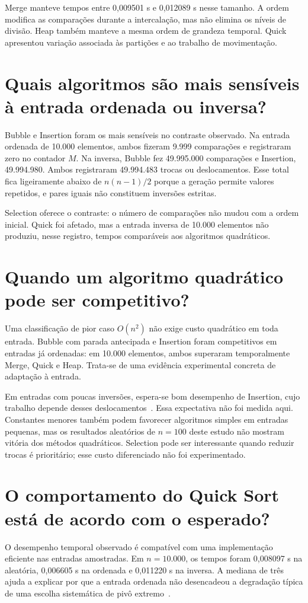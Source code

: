 \documentclass[12pt]{uftex}
\begin{document}
Merge manteve tempos entre 0,009501 s e 0,012089 s nesse tamanho. A ordem modifica as comparações durante a intercalação, mas não elimina os níveis de divisão. Heap também manteve a mesma ordem de grandeza temporal. Quick apresentou variação associada às partições e ao trabalho de movimentação.

\section{Quais algoritmos são mais sensíveis à entrada ordenada ou inversa?}
Bubble e Insertion foram os mais sensíveis no contraste observado. Na entrada ordenada de 10.000 elementos, ambos fizeram 9.999 comparações e registraram zero no contador $M$. Na inversa, Bubble fez 49.995.000 comparações e Insertion, 49.994.980. Ambos registraram 49.994.483 trocas ou deslocamentos. Esse total fica ligeiramente abaixo de $n(n-1)/2$ porque a geração permite valores repetidos, e pares iguais não constituem inversões estritas.

Selection oferece o contraste: o número de comparações não mudou com a ordem inicial. Quick foi afetado, mas a entrada inversa de 10.000 elementos não produziu, nesse registro, tempos comparáveis aos algoritmos quadráticos.

\section{Quando um algoritmo quadrático pode ser competitivo?}
Uma classificação de pior caso $O(n^2)$ não exige custo quadrático em toda entrada. Bubble com parada antecipada e Insertion foram competitivos em entradas já ordenadas: em 10.000 elementos, ambos superaram temporalmente Merge, Quick e Heap. Trata-se de uma evidência experimental concreta de adaptação à entrada.

Em entradas com poucas inversões, espera-se bom desempenho de Insertion, cujo trabalho depende desses deslocamentos~\cite{elementary}. Essa expectativa não foi medida aqui. Constantes menores também podem favorecer algoritmos simples em entradas pequenas, mas os resultados aleatórios de $n=100$ deste estudo não mostram vitória dos métodos quadráticos. Selection pode ser interessante quando reduzir trocas é prioritário; esse custo diferenciado não foi experimentado.

\section{O comportamento do Quick Sort está de acordo com o esperado?}
O desempenho temporal observado é compatível com uma implementação eficiente nas entradas amostradas. Em $n=10.000$, os tempos foram 0,008097 s na aleatória, 0,006605 s na ordenada e 0,011220 s na inversa. A mediana de três ajuda a explicar por que a entrada ordenada não desencadeou a degradação típica de uma escolha sistemática de pivô extremo~\cite{quick}.
\end{document}
